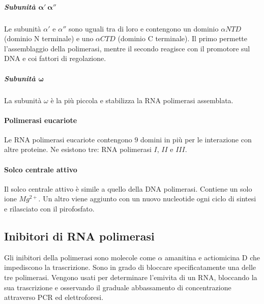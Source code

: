 				\subparagraph{Subunit\`a $\mathbf{\alpha'\ \alpha''}$}
				Le subunit\`a $\alpha'$ e $\alpha''$ sono uguali tra di loro e contengono un dominio $\alpha NTD$ (dominio N terminale) e uno $\alpha CTD$ (dominio C terminale).
				Il primo permette l'assemblaggio della polimerasi, mentre il secondo reagisce con il promotore sul DNA e coi fattori di regolazione.

				\subparagraph{Subunit\`a $\mathbf{\omega}$}
				La subunit\`a $\omega$ \`e la pi\`u piccola e stabilizza la RNA polimerasi assemblata.

			\paragraph{Polimerasi eucariote}
			Le RNA polimerasi eucariote contengono $9$ domini in pi\`u per le interazione con altre proteine.
			Ne esistono tre: RNA polimerasi $I$, $II$ e $III$.

			\paragraph{Solco centrale attivo}
			Il solco centrale attivo \`e simile a quello della DNA polimerasi.
			Contiene un solo ione \emph{$Mg^{2+}$}.
			Un altro viene aggiunto con un nuovo nucleotide ogni ciclo di sintesi e rilasciato con il pirofosfato.

	\subsection{Inibitori di RNA polimerasi}
	Gli inibitori della polimerasi sono molecole come $\alpha$ amanitina e actiomicina D che impediscono la trascrizione.
	Sono in grado di bloccare specificatamente una delle tre polimerasi.
	Vengono usati per determinare l'emivita di un RNA, bloccando la sua trascrizione e osservando il graduale abbassamento di concentrazione attraverso PCR ed elettroforesi.

